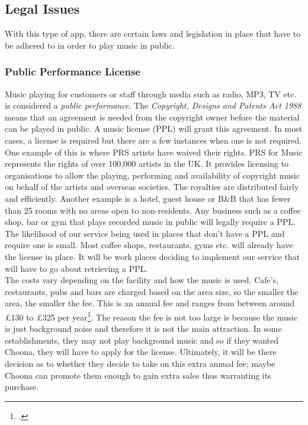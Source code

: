 \subsection{Legal Issues}
With this type of app, there are certain laws and legislation in place that have to be adhered to in order to play music in public.  
\subsubsection{Public Performance License}
    Music playing for customers or staff through media such as radio, MP3, TV etc. is considered a \emph{public performance}. The \emph{Copyright, Designs and Patents Act 1988} means that an agreement is needed from the copyright owner before the material can be played in public. A music license (PPL) will grant this agreement. In most cases, a license is required but there are a few instances when one is not required. One example of this is where PRS  artists have waived their rights. PRS for Music represents the rights of over 100,000 artists in the UK.  It provides licensing to organisations to allow the playing, performing and availability of copyright music on behalf of the artists and overseas societies.  The royalties are distributed fairly and efficiently.  Another example is a hotel, guest house or B\&B that has fewer than 25 rooms with no areas open to non-residents. 
    Any business such as a coffee shop, bar or gym that plays recorded music in public will legally require a PPL. The likelihood of our service being used in places that don't have a PPL and require one is small.  Most coffee shops, restaurants, gyms etc. will already have the license in place.  It will be work places deciding to implement our service that will have to go about retrieving a PPL.\\
The costs vary depending on the facility and how the music is used.  Cafe's, restaurants, pubs and bars are charged based on the area size, so the smaller the area, the smaller the fee.  This is an annual fee and ranges from between around £130 to £325 per year\footcite{ppl}.  The reason the fee is not too large is because the music is just background noise and therefore it is not the main attraction.  In some establishments, they may not play background music and so if they wanted Choona, they will have to apply for the license.  Ultimately, it will be there decision as to whether they decide to take on this extra annual fee; maybe Choona can promote them enough to gain extra sales thus warranting its purchase.    \\
